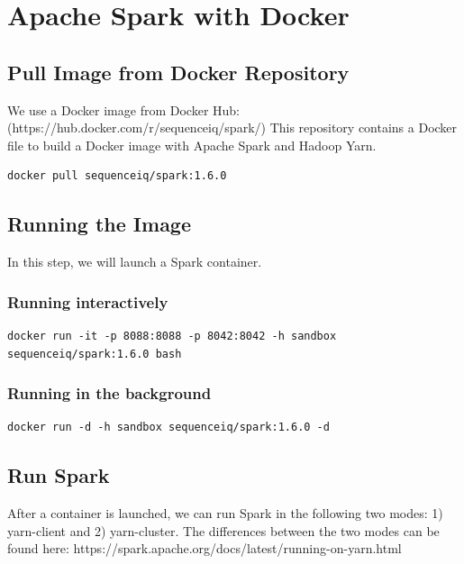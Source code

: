 \section{Apache Spark with Docker}\label{s:apache-spark-with-docker}

\subsection{Pull Image from Docker
Repository}

We use a Docker image from Docker Hub:
(https://hub.docker.com/r/sequenceiq/spark/) This repository contains a
Docker file to build a Docker image with Apache Spark and Hadoop Yarn.

\begin{lstlisting}
docker pull sequenceiq/spark:1.6.0
\end{lstlisting}

\subsection{Running the Image}

In this step, we will launch a Spark container.

\subsubsection{Running interactively}

\begin{lstlisting}
docker run -it -p 8088:8088 -p 8042:8042 -h sandbox sequenceiq/spark:1.6.0 bash
\end{lstlisting}

\subsubsection{Running in the
background}

\begin{lstlisting}
docker run -d -h sandbox sequenceiq/spark:1.6.0 -d
\end{lstlisting}

\subsection{Run Spark}

After a container is launched, we can run Spark in the following two
modes: 1) yarn-client and 2) yarn-cluster. The differences between the
two modes can be found here:
https://spark.apache.org/docs/latest/running-on-yarn.html

